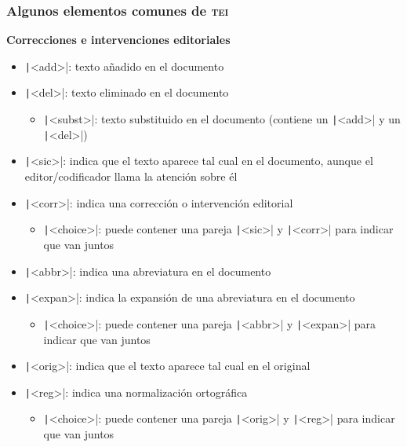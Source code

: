 \documentclass[%
  handout, %
  ]{beamer}
\newcommand*{\azul}[1]{\textcolor{bluenivaca}{#1}}
\newcommand*{\TEI}{\textsc{tei}}
\begin{document}
\begin{frame}
  \frametitle{Algunos elementos comunes de \TEI}

  \textbf{\azul{Correcciones e intervenciones editoriales}}

  \smallskip

  \begin{itemize}
      
    \item \texttt|<add>|: texto añadido en el documento
    \item \texttt|<del>|: texto eliminado en el documento
      \begin{itemize}
        \item \texttt|<subst>|: texto substituido en el documento (contiene un  \texttt|<add>| y un  \texttt|<del>|)
      \end{itemize}
    \item \texttt|<sic>|: indica que el texto aparece tal cual en el documento, aunque el editor/codificador llama la atención sobre él
    \item \texttt|<corr>|: indica una corrección o intervención editorial
      \begin{itemize}
        \item \texttt|<choice>|: puede contener una pareja \texttt|<sic>| y \texttt|<corr>| para indicar que van juntos
      \end{itemize}
    \item \texttt|<abbr>|: indica una abreviatura en el documento
    \item \texttt|<expan>|: indica la expansión de una abreviatura en el documento
       \begin{itemize}
        \item \texttt|<choice>|: puede contener una pareja \texttt|<abbr>| y \texttt|<expan>| para indicar que van juntos
      \end{itemize}
    \item \texttt|<orig>|: indica que el texto aparece tal cual en el original
    \item \texttt|<reg>|: indica una normalización ortográfica
      \begin{itemize}
        \item \texttt|<choice>|: puede contener una pareja \texttt|<orig>| y \texttt|<reg>| para indicar que van juntos
      \end{itemize}
  \end{itemize}
\end{frame}
\end{document}
